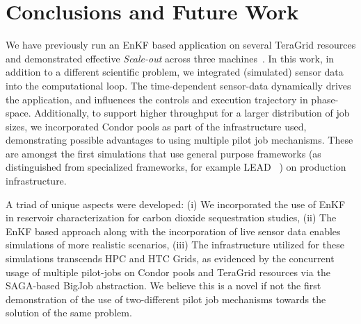 \documentclass[10pt,conference,final]{IEEEtran}
\newcommand{\jhanote}[1]{ {\textcolor{red} { ***Jha: #1 }}}
\newcommand{\yyenote}[1]{ {\textcolor{blue} { ***yye00: #1 }}}
\newcommand{\jhanote}[1]{}
\newcommand{\yyenote}[1]{}
\begin{document}



\section*{Conclusions and Future Work}

We have previously run an EnKF based application on several TeraGrid resources and demonstrated effective {\it Scale-out} across three machines~\cite{gmac}. In this work, in addition to a different scientific problem, we integrated (simulated) sensor data into the computational loop. The time-dependent sensor-data dynamically drives the application, and influences the controls and execution trajectory in phase-space. Additionally, to support higher throughput for a larger distribution of 
job sizes, we incorporated Condor pools as part of the infrastructure used,
demonstrating possible advantages to using multiple pilot job mechanisms. These are amongst the first simulations that use general purpose frameworks (as distinguished from specialized frameworks, for example LEAD ~\cite{LEAD}) on production infrastructure.


A triad of unique aspects were developed: (i) We incorporated the use of EnKF in reservoir characterization for carbon dioxide sequestration studies, %
(ii) The EnKF based approach along with the incorporation of live sensor data enables simulations of more realistic scenarios, (iii) The infrastructure utilized for these simulations transcends HPC and HTC Grids, as evidenced by the concurrent usage of multiple pilot-jobs on Condor pools and TeraGrid resources via the SAGA-based BigJob abstraction.
We believe this is a novel if not the first demonstration of the use of two-different pilot job mechanisms towards the solution of the same problem.


 

\end{document}
